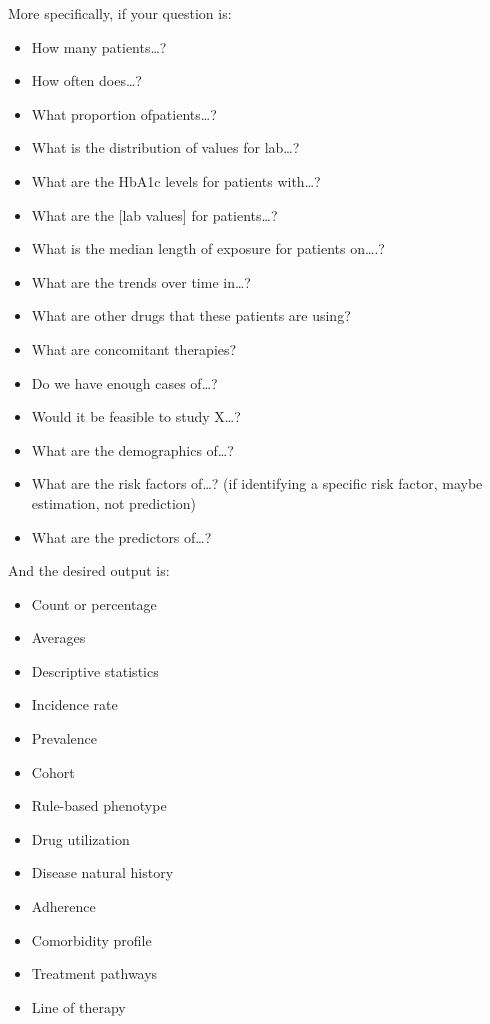 \documentclass[11pt]{book}
\providecommand{\tightlist}{%
  \setlength{\itemsep}{0pt}\setlength{\parskip}{0pt}}
\theoremstyle{definition}
\theoremstyle{definition}
\theoremstyle{definition}
\theoremstyle{remark}
\begin{document}
More specifically, if your question is:

\begin{itemize}
\tightlist
\item
  How many patients\ldots?
\item
  How often does\ldots?
\item
  What proportion ofpatients\ldots?
\item
  What is the distribution of values for lab\ldots?
\item
  What are the HbA1c levels for patients with\ldots?
\item
  What are the {[}lab values{]} for patients\ldots?
\item
  What is the median length of exposure for patients on\ldots.?
\item
  What are the trends over time in\ldots?
\item
  What are other drugs that these patients are using?
\item
  What are concomitant therapies?
\item
  Do we have enough cases of\ldots?
\item
  Would it be feasible to study X\ldots?
\item
  What are the demographics of\ldots?
\item
  What are the risk factors of\ldots? (if identifying a specific risk factor, maybe estimation, not prediction)
\item
  What are the predictors of\ldots?
\end{itemize}

And the desired output is:

\begin{itemize}
\tightlist
\item
  Count or percentage
\item
  Averages
\item
  Descriptive statistics
\item
  Incidence rate
\item
  Prevalence
\item
  Cohort
\item
  Rule-based phenotype
\item
  Drug utilization
\item
  Disease natural history
\item
  Adherence
\item
  Comorbidity profile
\item
  Treatment pathways
\item
  Line of therapy
\end{itemize}
\end{document}
